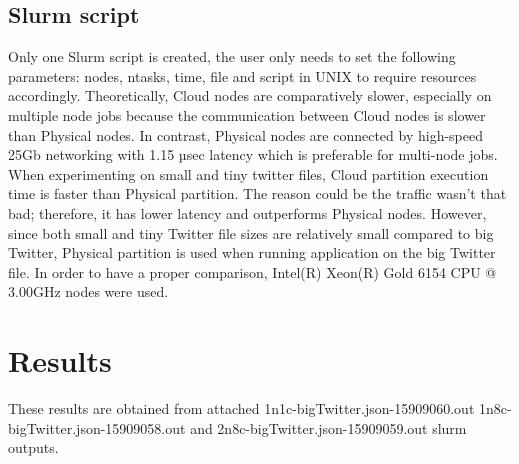 \documentclass[11pt]{article}
\begin{document}
\subsection{Slurm script}

Only one Slurm script is created, the user only needs to set the following parameters: nodes, ntasks, time, file and script in UNIX to require resources accordingly. Theoretically, Cloud nodes are comparatively slower, especially on multiple node jobs because the communication between Cloud nodes is slower than Physical nodes. In contrast, Physical nodes are connected by high-speed 25Gb networking with 1.15 µsec latency which is preferable for multi-node jobs. When experimenting on small and tiny twitter files, Cloud partition execution time is faster than Physical partition. The reason could be the traffic wasn't that bad; therefore, it has lower latency and outperforms Physical nodes.  However, since both small and tiny Twitter file sizes are relatively small compared to big Twitter, Physical partition is used when running application on the big Twitter file. In order to have a proper comparison, Intel(R) Xeon(R) Gold 6154 CPU @ 3.00GHz nodes were used. 

\section{Results}


These results are obtained from attached 1n1c-bigTwitter.json-15909060.out 1n8c-bigTwitter.json-15909058.out and 2n8c-bigTwitter.json-15909059.out slurm outputs.
\end{document}
